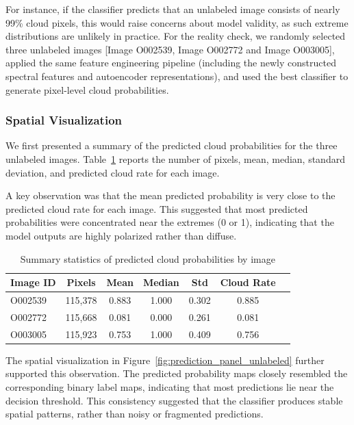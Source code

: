 \documentclass[10pt,letterpaper]{article}
\begin{document}
For instance, if the classifier predicts that an unlabeled image consists of nearly 99\% cloud pixels, this would raise concerns about model validity, as such extreme distributions are unlikely in practice. For the reality check, we randomly selected three unlabeled images [Image O002539, Image O002772 and Image O003005], applied the same feature engineering pipeline (including the newly constructed spectral features and autoencoder representations), and used the best classifier to generate pixel-level cloud probabilities.

\subsubsection{Spatial Visualization}

We first presented a summary of the predicted cloud probabilities for the three unlabeled images. Table~\ref{tab:unlabeled_summary} reports the number of pixels, mean, median, standard deviation, and predicted cloud rate for each image. 

A key observation was that the mean predicted probability is very close to the predicted cloud rate for each image. This suggested that most predicted probabilities were concentrated near the extremes (0 or 1), indicating that the model outputs are highly polarized rather than diffuse.

\begin{table}[H]
\centering
\footnotesize 

\setlength{\tabcolsep}{4pt}   
\renewcommand{\arraystretch}{1.1} 
\caption{Summary statistics of predicted cloud probabilities by image}
\label{tab:unlabeled_summary}
\begin{tabular}{lcccccc}
\toprule
Image ID & Pixels & Mean & Median & Std & Cloud Rate \\
\midrule
O002539 & 115,378 & 0.883 & 1.000 & 0.302 & 0.885 \\
O002772 & 115,668 & 0.081 & 0.000 & 0.261 & 0.081 \\
O003005 & 115,923 & 0.753 & 1.000 & 0.409 & 0.756 \\
\bottomrule
\end{tabular}
\end{table}


The spatial visualization in Figure~\ref{fig:prediction_panel_unlabeled} further supported this observation. The predicted probability maps closely resembled the corresponding binary label maps, indicating that most predictions lie near the decision threshold. This consistency suggested that the classifier produces stable spatial patterns, rather than noisy or fragmented predictions.
\end{document}
